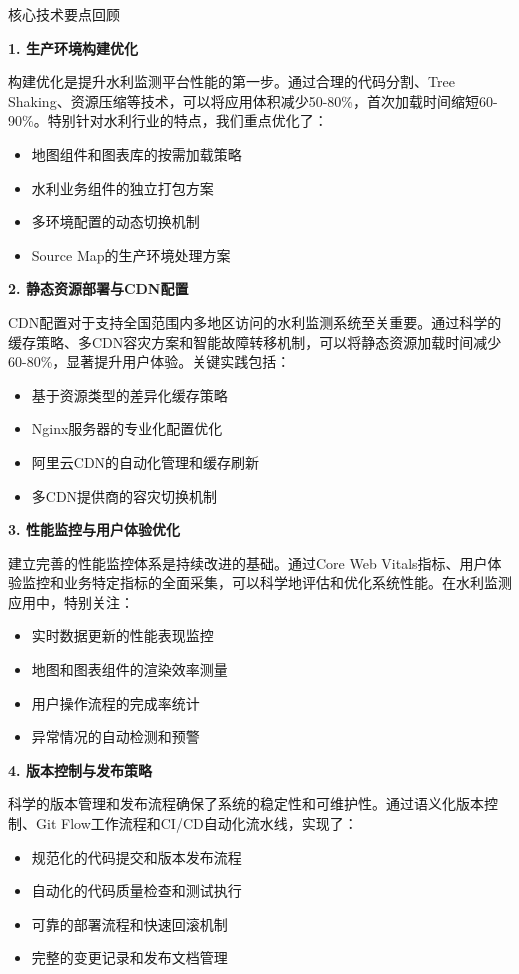 {{ 核心技术要点回顾

\textbf{1. 生产环境构建优化}

构建优化是提升水利监测平台性能的第一步。通过合理的代码分割、Tree Shaking、资源压缩等技术，可以将应用体积减少50-80\%，首次加载时间缩短60-90\%。特别针对水利行业的特点，我们重点优化了：

\begin{itemize}
\tightlist
\item
  地图组件和图表库的按需加载策略
\item
  水利业务组件的独立打包方案
\item
  多环境配置的动态切换机制
\item
  Source Map的生产环境处理方案
\end{itemize}

\textbf{2. 静态资源部署与CDN配置}

CDN配置对于支持全国范围内多地区访问的水利监测系统至关重要。通过科学的缓存策略、多CDN容灾方案和智能故障转移机制，可以将静态资源加载时间减少60-80\%，显著提升用户体验。关键实践包括：

\begin{itemize}
\tightlist
\item
  基于资源类型的差异化缓存策略
\item
  Nginx服务器的专业化配置优化
\item
  阿里云CDN的自动化管理和缓存刷新
\item
  多CDN提供商的容灾切换机制
\end{itemize}

\textbf{3. 性能监控与用户体验优化}

建立完善的性能监控体系是持续改进的基础。通过Core Web Vitals指标、用户体验监控和业务特定指标的全面采集，可以科学地评估和优化系统性能。在水利监测应用中，特别关注：

\begin{itemize}
\tightlist
\item
  实时数据更新的性能表现监控
\item
  地图和图表组件的渲染效率测量
\item
  用户操作流程的完成率统计
\item
  异常情况的自动检测和预警
\end{itemize}

\textbf{4. 版本控制与发布策略}

科学的版本管理和发布流程确保了系统的稳定性和可维护性。通过语义化版本控制、Git Flow工作流程和CI/CD自动化流水线，实现了：

\begin{itemize}
\tightlist
\item
  规范化的代码提交和版本发布流程
\item
  自动化的代码质量检查和测试执行
\item
  可靠的部署流程和快速回滚机制
\item
  完整的变更记录和发布文档管理
\end{itemize}

}}
